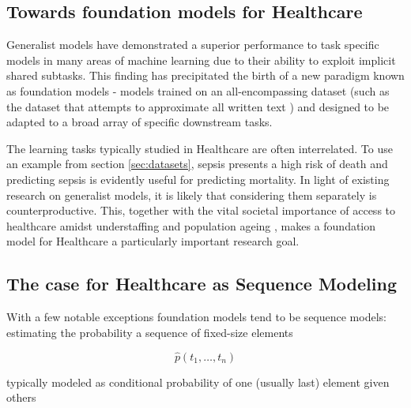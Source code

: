 \subsection{Towards foundation models for Healthcare}

Generalist models have demonstrated a superior performance to task specific models in many areas of machine learning \cite{reedGeneralistAgent2022} due to their ability to exploit implicit shared subtasks. 
This finding has precipitated the birth of a new paradigm known as foundation models \cite{zhouComprehensiveSurveyPretrained2023} - models trained on an all-encompassing dataset (such as the dataset that attempts to approximate all written text \cite{chelbaOneBillionWord2013}) and designed to be adapted to a broad array of specific downstream tasks.

The learning tasks typically studied in Healthcare are often interrelated. 
To use an example from section \ref{sec:datasets}, sepsis presents a high risk of death \cite{schlichtingRecognizingManagingSevere2007} and predicting sepsis is evidently useful for predicting mortality.
In light of existing research on generalist models, it is likely that considering them separately is counterproductive.
This, together with the vital societal importance of access to healthcare amidst understaffing \cite{ashleyy.metcalfHospitalUnitUnderstaffing2016, hudsonUnderstaffing2015, mercerMessageEditorinChief2008, munnUnderstaffingWardsCompromising2017, r.stanleyUnderstaffedOverwhelmed2010, SurveyShowsHidden1993, thelancetHealthcareSystemStaffing2018, UnderstaffingSignificantIssue2012} and population ageing \cite{2012health, Aslam2021Ageing, L1991aging, Lloyd2012Population, Mahishale2015Ageing, Mann2004aging, Sammy2019global, Suzman2015Health}, makes a foundation model for Healthcare a particularly important research goal.

\subsection{The case for Healthcare as Sequence Modeling}
\label{sec:sequencemodel}

With a few notable exceptions foundation models tend to be sequence models: estimating the probability a sequence of fixed-size elements

\begin{equation}
    \hat{p}(t_1, \dots, t_n)
\end{equation}

typically modeled as conditional probability of one (usually last) element given others


